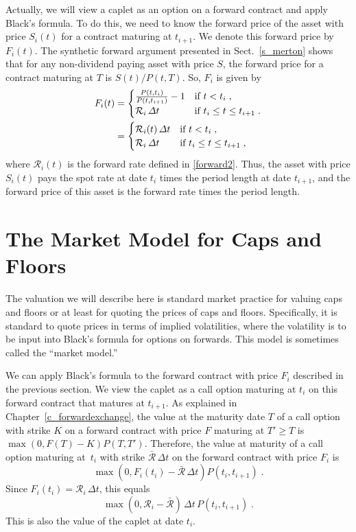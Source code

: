 Actually, we will view a caplet as an option on a forward contract and apply Black's formula.  To do this, we need to know the forward price of the asset with price $S_i(t)$ for a contract maturing at $t_{i+1}$.  We denote this forward price by $F_i(t)$.  The synthetic forward argument presented in Sect.~\ref{s_merton} shows that for any non-dividend paying asset with price $S$, the forward price for a contract maturing at $T$ is $S(t)/P(t,T)$.  So, $F_i$ is given by
\begin{align}
F_i(t) &= \begin{cases} \frac{P(t,t_i)}{P(t,t_{i+1})}-1 & \text{if } t < t_{i}\; ,\\
\mathcal{R}_i\,\varDelta t & \text{if }  t_{i} \leq t \leq t_{i+1}\;. \end{cases}\notag\\
&= \begin{cases}\mathcal{R}_i(t)\,\varDelta t & \text{if } t < t_{i}\; ,\\
\mathcal{R}_i\,\varDelta t & \text{if }  t_{i} \leq t \leq t_{i+1}\;, \end{cases}\label{F_i}
\end{align}
where $\mathcal{R}_i(t)$ is the forward rate defined in \eqref{forward2}.  Thus, the asset with price $S_i(t)$ pays the spot rate at date $t_i$ times the period length at date $t_{i+1}$, and the forward price of this asset is the forward rate times the period length.



\section{The Market Model for Caps and Floors}\label{s_valuingcaps}

The valuation we will describe here is standard market practice for valuing caps and floors or at least for quoting the prices of caps and floors.  Specifically, it is standard to quote prices in terms of implied volatilities, where the volatility is to be input into Black's formula for options on forwards.  This model is sometimes called the ``market model.'' 

We can apply Black's formula to the forward contract with price $F_i$ described in the previous section.  We view the caplet  as a call option maturing at $t_i$ on this forward contract that matures at $t_{i+1}$.  As explained in Chapter~\ref{c_forwardexchange}, the value at the maturity date $T$ of a call option with strike $K$ on a forward contract with price $F$ maturing at $T' \geq T$ is $\max(0,F(T)-K)P(T,T')$.  Therefore, the value at maturity of a call option maturing at~$t_i$ with strike $\bar{\mathcal{R}}\,\varDelta t$ on the forward contract with price $F_i$ is
$$\max(0,F_i(t_i)-\bar{\mathcal{R}}\,\varDelta t)P(t_i,t_{i+1})\; .$$
Since $F_i(t_i)=\mathcal{R}_i\,\varDelta t$, this equals 
\begin{equation}\label{capletvalue}
\max(0,\mathcal{R}_i-\bar{\mathcal{R}})\,\varDelta t\,P(t_i,t_{i+1})\;.
\end{equation}
This is also the value of the caplet at date $t_i$.

